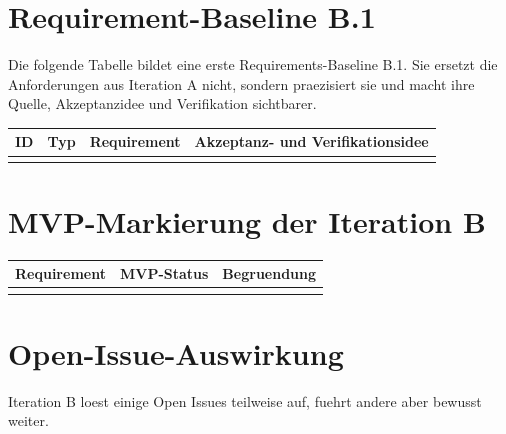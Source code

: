 \section{Requirement-Baseline B.1}

Die folgende Tabelle bildet eine erste Requirements-Baseline B.1. Sie ersetzt die Anforderungen aus Iteration A nicht, sondern praezisiert sie und macht ihre Quelle, Akzeptanzidee und Verifikation sichtbarer.

\begin{longtable}{L{0.17\textwidth} L{0.14\textwidth} L{0.32\textwidth} L{0.23\textwidth}}
\toprule
ID & Typ & Requirement & Akzeptanz- und Verifikationsidee \\
\midrule
{}
\bottomrule
\end{longtable}

\section{MVP-Markierung der Iteration B}

\begin{longtable}{L{0.20\textwidth} L{0.16\textwidth} L{0.50\textwidth}}
\toprule
Requirement & MVP-Status & Begruendung \\
\midrule
{}
\bottomrule
\end{longtable}

\section{Open-Issue-Auswirkung}

Iteration B loest einige Open Issues teilweise auf, fuehrt andere aber bewusst weiter.

